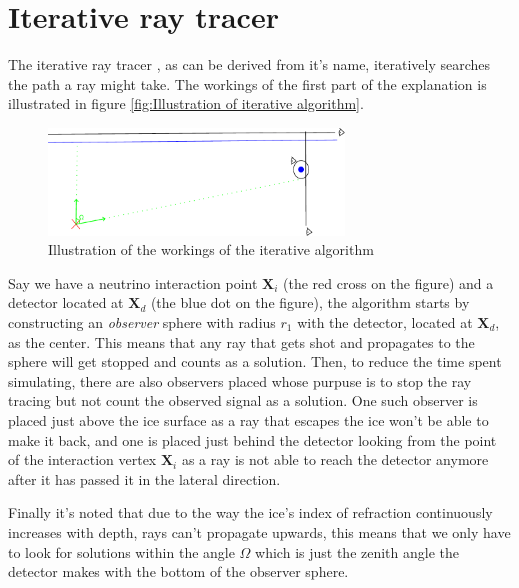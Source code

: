 \documentclass[11pt,a4paper,faculty=we,language=en,doctype=report]{cls/ugent-doc}
\begin{document}
\section{Iterative ray tracer}
\label{sec:Iterative}
The iterative ray tracer \cite{2022icrc.confE1027O}, as can be derived from
it's name, iteratively searches the path a ray might take. The workings of the
first part of the explanation is illustrated in figure \ref{fig:Illustration of
iterative algorithm}.  
\begin{figure}
  \centering
  \includegraphics[width=0.7\textwidth]{algoillu.pdf}
  \caption{Illustration of the workings of the iterative algorithm}
  \label{fig:Illustration of iterative algorithm}
\end{figure}
Say we have a neutrino interaction point $\mathbf{X}_i$
(the red cross on the figure) and a detector located at $\mathbf{X}_d$ (the
blue dot on the figure), the algorithm starts by constructing an
\textit{observer} sphere with radius $r_1$ with the detector, located at $\mathbf{X}_d$, as the
center.  This means that any ray that gets shot and propagates to the sphere
will get stopped and counts as a solution.  Then, to reduce the time spent simulating, there are also observers placed
whose purpuse is to stop the ray tracing but not count the observed signal as a solution.
One such observer is placed 
just above the ice surface as a ray that escapes the ice won't be able to make it back, and one
is placed just behind the detector looking from the point of the interaction vertex $\mathbf{X}_i$ as
a ray is not able to reach the detector anymore after it has passed it in the
lateral direction. 

Finally it's noted that due to the way the ice's index of refraction
continuously increases with depth, rays can't propagate upwards, this means that we only 
have to look for solutions within the angle $\Omega$ which is just the zenith angle the detector
makes with the bottom of the observer sphere.
\end{document}
